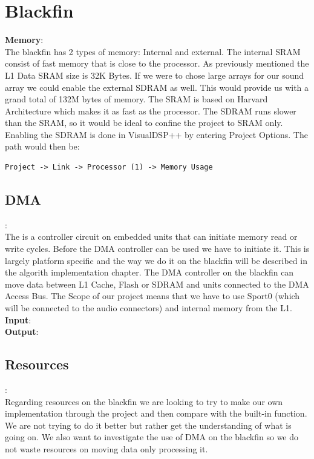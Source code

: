 \section{Blackfin}
\textbf{Memory}:\\
The blackfin has 2 types of memory: Internal and external. The internal SRAM consist of fast memory that is close to the processor.  As previously mentioned the L1 Data SRAM size is 32K Bytes. If we were to chose large arrays for our sound array we could enable the external SDRAM as well. This would provide us with a grand total of 132M bytes of memory. The SRAM is based on Harvard Architecture which makes it as fast as the processor. The SDRAM runs slower than the SRAM, so it would be ideal to confine the project to SRAM only. Enabling the SDRAM is done in VisualDSP++ by entering Project Options. The path would then be:
\begin{verbatim}
Project -> Link -> Processor (1) -> Memory Usage
\end{verbatim}
\subsection{DMA}:\\
The is a controller circuit on embedded units that can initiate memory read or write cycles. Before the DMA controller can be used we have to initiate it. This is largely platform specific and the way we do it on the blackfin will be described in the algorith implementation chapter. The DMA controller on the blackfin can move data between L1 Cache, Flash or SDRAM and units connected to the DMA Access Bus. The Scope of our project means that we have to use Sport0 (which will be connected to the audio connectors) and internal memory from the L1. \\
\textbf{Input}:\\
\textbf{Output}:\\
\subsection{Resources}:\\
Regarding resources on the blackfin we are looking to try to make our own implementation through the project and then compare with the built-in function. We are not trying to do it better but rather get the understanding of what is going on.
We also want to investigate the use of DMA on the blackfin so we do not waste resources on moving data only processing it.
